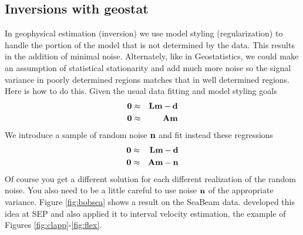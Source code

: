 \subsection{Inversions with geostat}
In geophysical estimation (inversion) we use model styling
(regularization) to handle the portion of the model that
is not determined by the data.
This results in the addition of minimal noise.
Alternately, like in Geostatistics,
we could make an assumption of statistical stationarity
and add much more noise so the signal variance in poorly determined
regions matches that in well determined regions.
Here is how to do this.
Given the usual data fitting and model styling goals
\begin{eqnarray}
\bold 0 &\approx& \bold L \bold m -\bold d
\\
\bold 0 &\approx& \bold A \bold m
\end{eqnarray}
We introduce a sample of random noise $\bold n$ and fit instead
these regressions
\begin{eqnarray}
\bold 0 &\approx& \bold L \bold m -\bold d
\\
\bold 0 &\approx& \bold A \bold m -\bold n
\end{eqnarray}
Of course you get a different solution for each different
realization of the random noise.
You also need to be a little careful to use noise $\bold n$
of the appropriate variance.
Figure \ref{fig:bobsea} shows a result on the SeaBeam data.
 developed this idea at SEP and also
applied it to interval velocity estimation,
the example of Figures \ref{fig:clapp}-\ref{fig:flex}.


